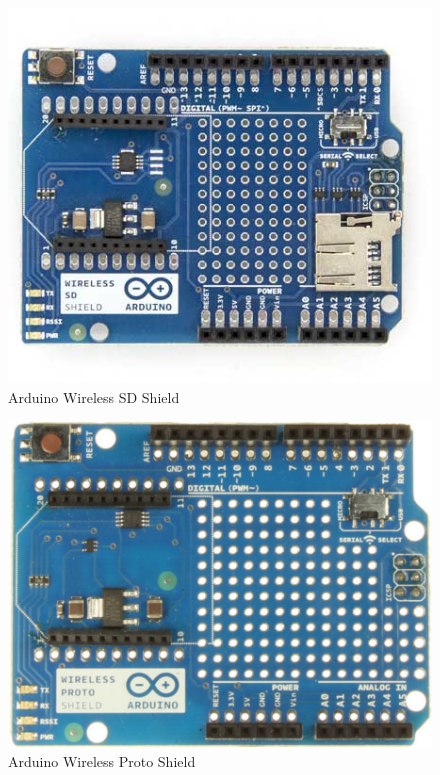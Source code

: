   \begin{figure}[htbp]
   \centering
   \includegraphics[scale=0.4,keepaspectratio=true]{./imagenes/arduino-wireless-shield.jpg}
   \caption{Arduino Wireless SD Shield}
   \label{figura:ArduinoWirelessShield}
  \end{figure}

  \begin{figure}[htbp]
   \centering
   \includegraphics[scale=0.4,keepaspectratio=true]{./imagenes/arduino-wireless-proto-shield.jpg}
   \caption{Arduino Wireless Proto Shield}
   \label{figura:ArduinoWirelessProtoShield}
  \end{figure}

